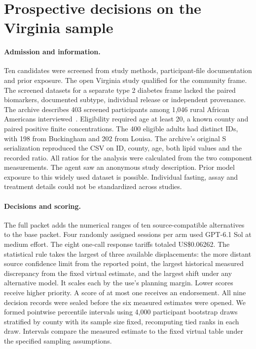 \section{Prospective decisions on the Virginia sample}
\label{app:virginia}
\paragraph{Admission and information.}
Ten candidates were screened from study methods, participant-file documentation and prior exposure. The open Virginia study qualified for the community frame. The screened datasets for a separate type 2 diabetes frame lacked the paired biomarkers, documented subtype, individual release or independent provenance. The archive describes 403 screened participants among 1,046 rural African Americans interviewed~\cite{virginiadata,virginiastudy}. Eligibility required age at least 20, a known county and paired positive finite concentrations. The 400 eligible adults had distinct IDs, with 198 from Buckingham and 202 from Louisa. The archive's original S serialization reproduced the CSV on ID, county, age, both lipid values and the recorded ratio. All ratios for the analysis were calculated from the two component measurements. The agent saw an anonymous study description. Prior model exposure to this widely used dataset is possible. Individual fasting, assay and treatment details could not be standardized across studies.

\paragraph{Decisions and scoring.}
The full packet adds the numerical ranges of ten source-compatible alternatives to the base packet. Four randomly assigned sessions per arm used GPT-6.1 Sol at medium effort. The eight one-call response tariffs totaled US\$0.06262. The statistical rule takes the largest of three available displacements: the more distant source confidence limit from the reported point, the largest historical measured discrepancy from the fixed virtual estimate, and the largest shift under any alternative model. It scales each by the use's planning margin. Lower scores receive higher priority. A score of at most one receives an endorsement. All nine decision records were sealed before the six measured estimates were opened. We formed pointwise percentile intervals using 4,000 participant bootstrap draws stratified by county with its sample size fixed, recomputing tied ranks in each draw. Intervals compare the measured estimate to the fixed virtual table under the specified sampling assumptions.

